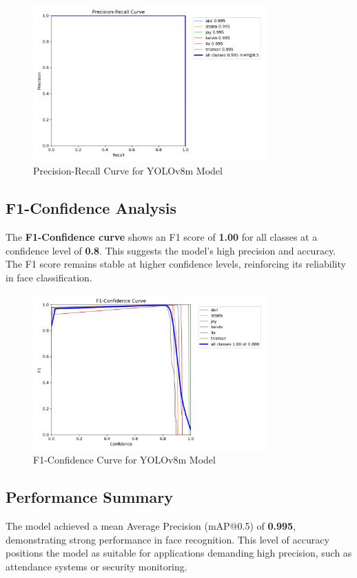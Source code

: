 \begin{figure}[htbp]
    \centering
    \includegraphics[width=0.8\textwidth]{images/PR_curve (1).png}
    \caption{Precision-Recall Curve for YOLOv8m Model}
    \label{fig:pr_curve}
\end{figure}

\subsection{F1-Confidence Analysis}
The \textbf{F1-Confidence curve} shows an F1 score of \textbf{1.00} for all classes at a confidence level of \textbf{0.8}. This suggests the model’s high precision and accuracy. The F1 score remains stable at higher confidence levels, reinforcing its reliability in face classification.

\begin{figure}[htbp]
    \centering
    \includegraphics[width=0.8\textwidth]{images/F1_curve.png}
    \caption{F1-Confidence Curve for YOLOv8m Model}
    \label{fig:f1_curve}
\end{figure}

\subsection{Performance Summary}
The model achieved a mean Average Precision (mAP@0.5) of \textbf{0.995}, demonstrating strong performance in face recognition. This level of accuracy positions the model as suitable for applications demanding high precision, such as attendance systems or security monitoring.

